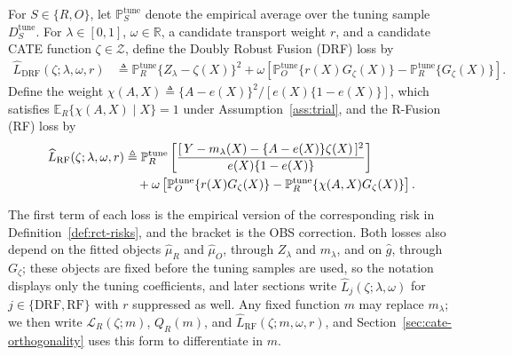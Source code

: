 \begin{definition}
\label{def:fusion-losses}
For $S\in\{R,O\}$, let $\mathbb P_S^{\mathrm{tune}}$ denote the empirical average over the tuning sample $D_S^{\mathrm{tune}}$. For $\lambda\in[0,1]$, $\omega\in\mathbb R$, a candidate transport weight $r$, and a candidate CATE function $\zeta\in\mathcal Z$, define the Doubly Robust Fusion (DRF) loss by
\begin{align}
\widehat L_{\mathrm{DRF}}(\zeta;\lambda,\omega,r)
&\triangleq\mathbb P_R^{\mathrm{tune}}\{Z_\lambda-\zeta(X)\}^2
+\omega\left[\mathbb P_O^{\mathrm{tune}}\{r(X)G_\zeta(X)\}-\mathbb P_R^{\mathrm{tune}}\{G_\zeta(X)\}\right].
\label{eq:dr-fusion-loss}
\end{align}
Define the weight $\chi(A,X)\triangleq\{A-e(X)\}^2/[e(X)\{1-e(X)\}]$, which satisfies $\mathbb E_R\{\chi(A,X)\mid X\}=1$ under Assumption~\ref{ass:trial}, and the R-Fusion (RF) loss by
\begin{align}
\widehat L_{\mathrm{RF}}(\zeta;\lambda,\omega,r)
&\triangleq\mathbb P_R^{\mathrm{tune}}\left[\frac{[\,Y-m_\lambda(X)-\{A-e(X)\}\zeta(X)\,]^2}{e(X)\{1-e(X)\}}\right]
\notag\\
&\quad+\omega\left[\mathbb P_O^{\mathrm{tune}}\{r(X)G_\zeta(X)\}-\mathbb P_R^{\mathrm{tune}}\{\chi(A,X)G_\zeta(X)\}\right].
\label{eq:rf-fusion-loss}
\end{align}
\end{definition}

The first term of each loss is the empirical version of the corresponding risk in Definition~\ref{def:rct-risks}, and the bracket is the OBS correction. Both losses also depend on the fitted objects $\widehat\mu_R$ and $\widehat\mu_O$, through $Z_\lambda$ and $m_\lambda$, and on $\widehat g$, through $G_\zeta$; these objects are fixed before the tuning samples are used, so the notation displays only the tuning coefficients, and later sections write $\widehat L_j(\zeta;\lambda,\omega)$ for $j\in\{\mathrm{DRF},\mathrm{RF}\}$ with $r$ suppressed as well.  Any fixed function $m$ may replace $m_\lambda$; we then write $\mathcal L_R(\zeta;m)$, $Q_R(m)$, and $\widehat L_{\mathrm{RF}}(\zeta;m,\omega,r)$, and Section~\ref{sec:cate-orthogonality} uses this form to differentiate in $m$.

